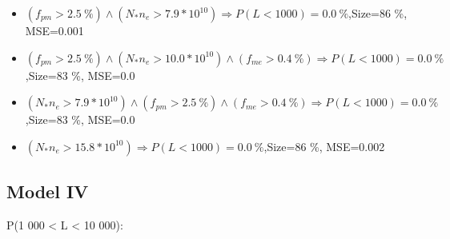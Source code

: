 \documentclass[numbered]{CSL}
\begin{document}
\begin{itemize}
\item $(f_{pm} > 2.5~\%) \land (N_* n_e > 7.9 * 10^{10}) \Rightarrow P(L < 1 000) = 0.0~\%$,\hfill Size=86 \%, MSE=0.001
\item $(f_{pm} > 2.5~\%) \land (N_* n_e > 10.0 * 10^{10}) \land (f_{me} > 0.4~\%) \Rightarrow P(L < 1 000) = 0.0~\%$,\hfill Size=83 \%, MSE=0.0
\item $(N_* n_e > 7.9 * 10^{10}) \land (f_{pm} > 2.5~\%) \land (f_{me} > 0.4~\%) \Rightarrow P(L < 1 000) = 0.0~\%$,\hfill Size=83 \%, MSE=0.0
\item $(N_* n_e > 15.8 * 10^{10}) \Rightarrow P(L < 1 000) = 0.0~\%$,\hfill Size=86 \%, MSE=0.002
\end{itemize}

\subsection{Model IV}
P(1 000 < L < 10 000):
\end{document}

